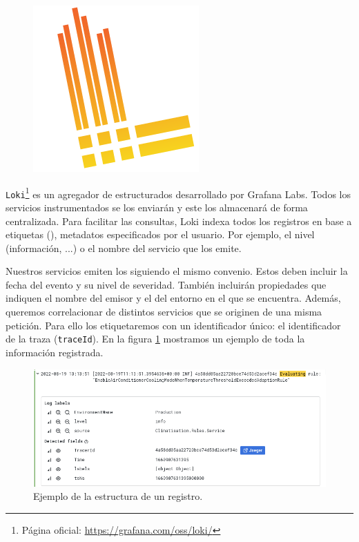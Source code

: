 \begin{figure}
  \vspace{-7pt}
  \hspace{-10pt}
  \centering
  \includegraphics[scale=0.85]{cap_despliegue/images/Loki}
\end{figure}

\texttt{Loki}\footnote{Página oficial: \url{https://grafana.com/oss/loki/}} es un agregador de  estructurados desarrollado por Grafana Labs. Todos los servicios instrumentados se los enviarán y este los almacenará de forma centralizada. Para facilitar las consultas, Loki indexa todos los registros en base a etiquetas (), metadatos especificados por el usuario. Por ejemplo, el nivel (información, ...) o el nombre del servicio que los emite.

Nuestros servicios emiten los  siguiendo el mismo convenio. Estos deben incluir la fecha del evento y su nivel de severidad. También incluirán propiedades que indiquen el nombre del emisor y el del entorno en el que se encuentra. Además, queremos correlacionar  de distintos servicios que se originen de una misma petición. Para ello los etiquetaremos con un identificador único: el identificador de la traza (\texttt{traceId}). En la figura \ref{fig:loki-ejemplo-logs} mostramos un ejemplo de toda la información registrada.

\begin{figure}[h]
  \centering
  \includegraphics[scale=0.5]{cap_despliegue/images/Ejemplo-log}
  \caption{Ejemplo de la estructura de un registro.}
  \label{fig:loki-ejemplo-logs}
\end{figure}

